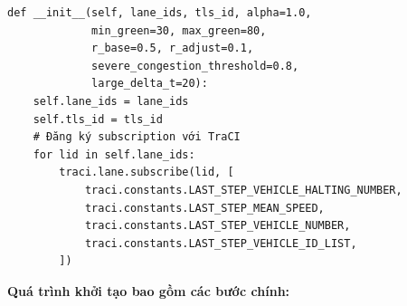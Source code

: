 \begin{lstlisting}[style=py, caption={Khởi tạo AdaptivePhaseController}]
def __init__(self, lane_ids, tls_id, alpha=1.0, 
             min_green=30, max_green=80,
             r_base=0.5, r_adjust=0.1, 
             severe_congestion_threshold=0.8,
             large_delta_t=20):
    self.lane_ids = lane_ids
    self.tls_id = tls_id
    # Đăng ký subscription với TraCI
    for lid in self.lane_ids:
        traci.lane.subscribe(lid, [
            traci.constants.LAST_STEP_VEHICLE_HALTING_NUMBER,
            traci.constants.LAST_STEP_MEAN_SPEED,
            traci.constants.LAST_STEP_VEHICLE_NUMBER,
            traci.constants.LAST_STEP_VEHICLE_ID_LIST,
        ])
\end{lstlisting}

\textbf{Quá trình khởi tạo bao gồm các bước chính:}


